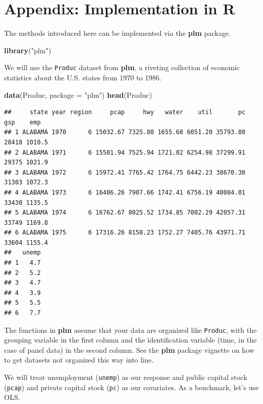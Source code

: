 \documentclass[
  12pt,
  oneside,openany]{book}
\newenvironment{Shaded}{\begin{snugshade}}{\end{snugshade}}
\newcommand{\DataTypeTok}[1]{\textcolor[rgb]{0.13,0.29,0.53}{#1}}
\newcommand{\KeywordTok}[1]{\textcolor[rgb]{0.13,0.29,0.53}{\textbf{#1}}}
\newcommand{\NormalTok}[1]{#1}
\newcommand{\StringTok}[1]{\textcolor[rgb]{0.31,0.60,0.02}{#1}}
\begin{document}
\hypertarget{appendix-implementation-in-r-1}{%
\section{Appendix: Implementation in R}\label{appendix-implementation-in-r-1}}

The methods introduced here can be implemented via the \textbf{plm} package.

\begin{Shaded}
\begin{Highlighting}[]
\KeywordTok{library}\NormalTok{(}\StringTok{"plm"}\NormalTok{)}
\end{Highlighting}
\end{Shaded}

We will use the \texttt{Produc} dataset from \textbf{plm}, a riveting collection of economic statistics about the U.S. states from 1970 to 1986.

\begin{Shaded}
\begin{Highlighting}[]
\KeywordTok{data}\NormalTok{(Produc, }\DataTypeTok{package =} \StringTok{"plm"}\NormalTok{)}
\KeywordTok{head}\NormalTok{(Produc)}
\end{Highlighting}
\end{Shaded}

\begin{verbatim}
##     state year region     pcap     hwy   water    util       pc   gsp    emp
## 1 ALABAMA 1970      6 15032.67 7325.80 1655.68 6051.20 35793.80 28418 1010.5
## 2 ALABAMA 1971      6 15501.94 7525.94 1721.02 6254.98 37299.91 29375 1021.9
## 3 ALABAMA 1972      6 15972.41 7765.42 1764.75 6442.23 38670.30 31303 1072.3
## 4 ALABAMA 1973      6 16406.26 7907.66 1742.41 6756.19 40084.01 33430 1135.5
## 5 ALABAMA 1974      6 16762.67 8025.52 1734.85 7002.29 42057.31 33749 1169.8
## 6 ALABAMA 1975      6 17316.26 8158.23 1752.27 7405.76 43971.71 33604 1155.4
##   unemp
## 1   4.7
## 2   5.2
## 3   4.7
## 4   3.9
## 5   5.5
## 6   7.7
\end{verbatim}

The functions in \textbf{plm} assume that your data are organized like \texttt{Produc}, with the grouping variable in the first column and the identification variable (time, in the case of panel data) in the second column. See the \textbf{plm} package vignette on how to get datasets not organized this way into line.

We will treat unemployment (\texttt{unemp}) as our response and public capital stock (\texttt{pcap}) and private capital stock (\texttt{pc}) as our covariates. As a benchmark, let's use OLS.
\end{document}
